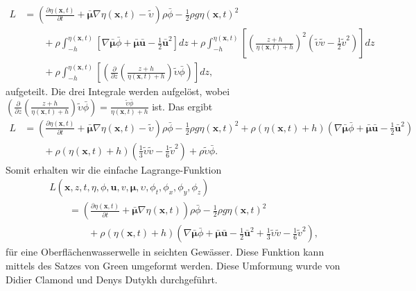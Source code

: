 \begin{align*}
	L&=
	\left(\frac{\partial \eta(\bm{x}, t)}{\partial t}
	+
	\bar{\bm{\mu}}  \nabla \eta(\bm{x}, t)
	-
	\widetilde{\upsilon}\right)\rho \bar{\phi}
	-
	\frac{1}{2}\rho g \eta(\bm{x}, t)^2
	\\
	&\qquad+
	\rho\int_{-h}^{\eta(\bm{x}, t)} \left[ \nabla \bar{\bm{\mu}}\bar{\phi} + \bar{\bm{\mu}}\bar{\bm{u}} - \frac{1}{2} \bar{\bm{u}}^2\right] dz
	+
	\rho\int_{-h}^{\eta(\bm{x}, t)} \left[ \left(\frac{z + h}{\eta(\bm{x}, t) + h}\right)^2 \left(\tilde{\upsilon}\tilde{v} - \frac{1}{2} \tilde{v}^2\right)\right] dz
	\\
	&\qquad+
	\rho\int_{-h}^{\eta(\bm{x}, t)} \left[ \left(\frac{\partial}{\partial z} \left(\frac{z + h}{\eta(\bm{x}, t) + h}\right)\tilde{\upsilon} \bar{\phi} \right)\right] dz,
\end{align*}
aufgeteilt.
Die drei Integrale werden aufgelöst, wobei $\left(\frac{\partial}{\partial z} \left(\frac{z + h}{\eta(\bm{x}, t) + h}\right)\tilde{\upsilon} \bar{\phi} \right) = \frac{\tilde{\upsilon} \bar{\phi}}{\eta(\bm{x}, t) + h}$ ist. Das ergibt
\begin{align*}
L&=
\left(\frac{\partial \eta(\bm{x}, t)}{\partial t}
+
\bar{\bm{\mu}} \nabla \eta(\bm{x}, t)
-
\widetilde{\upsilon}\right)\rho \bar{\phi}
-
\frac{1}{2}\rho g \eta(\bm{x}, t)^2
+
\rho(\eta(\bm{x}, t) + h) \left(\nabla \bar{\bm{\mu}}\bar{\phi} + \bar{\bm{\mu}}\bar{\bm{u}} - \frac{1}{2} \bar{\bm{u}}^2\right)
\\
&\qquad
+
\rho(\eta(\bm{x}, t) + h) \left(\frac{1}{3}\tilde{\upsilon}\tilde{v} - \frac{1}{6}\tilde{v}^2 \right)
+
\rho\tilde{\upsilon} \bar{\phi}.
\end{align*}
Somit erhalten wir die einfache Lagrange-Funktion
\begin{align*}
&L(\bm{x},z,t,\eta,\phi,\bm{u}, v, \bm{\mu},\upsilon,\phi_t,\phi_x,\phi_y,\phi_z)
\\
&\qquad
=\left(\frac{\partial \eta(\bm{x}, t)}{\partial t}
+
\bar{\bm{\mu}} \nabla \eta(\bm{x}, t) \right)\rho \bar{\phi}
-
\frac{1}{2}\rho g \eta(\bm{x}, t)^2
\\
&\qquad\qquad
+
\rho(\eta(\bm{x}, t) + h) \left(\nabla \bar{\bm{\mu}}\bar{\phi} + \bar{\bm{\mu}}\bar{\bm{u}} - \frac{1}{2} \bar{\bm{u}}^2 + \frac{1}{3} \tilde{\upsilon}\tilde{v} - \frac{1}{6}\tilde{v}^2\right),
\end{align*}
für eine Oberflächenwasserwelle in seichten Gewässer.
Diese Funktion kann mittels des Satzes von Green umgeformt werden.
Diese Umformung wurde von Didier Clamond und Denys Dutykh \cite{luke:CLAMOND201225} durchgeführt.

